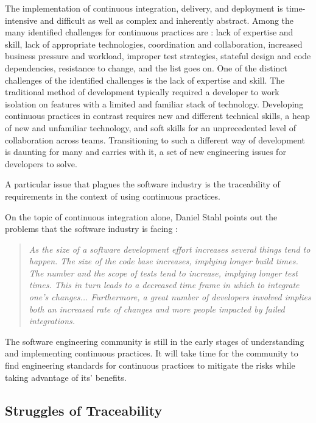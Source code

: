 \documentclass[12pt,a4paper]{article}
\begin{document}
The implementation of continuous integration, delivery, and deployment is time-intensive and difficult as well as complex and inherently abstract. Among the many identified challenges for continuous practices are \cite[p. ~3925-3927]{shahin_babar_zhu_2017}: lack of expertise and skill, lack of appropriate technologies, coordination and collaboration, increased business pressure and workload, improper test strategies, stateful design and code dependencies, resistance to change, and the list goes on. One of the distinct challenges of the identified challenges is the lack of expertise and skill. The traditional method of development typically required a developer to work isolation on features with a limited and familiar stack of technology. Developing continuous practices in contrast requires new and different technical skills, a heap of new and unfamiliar technology, and soft skills for an unprecedented level of collaboration across teams. Transitioning to such a different way of development is daunting for many and carries with it, a set of new engineering issues for developers to solve.

A particular issue that plagues the software industry is the traceability of requirements in the context of using continuous practices. 

On the topic of continuous integration alone, Daniel Stahl points out the problems that the software industry is facing \cite[p. ~60]{stahl_2017}:

\begin{quotation}
    \textit{As the size of a software development effort increases several things tend to happen. The size of the code base increases, implying longer build times. The number and the scope of tests tend to increase, implying longer test times. This in turn leads to a decreased time frame in which to integrate one's changes... Furthermore, a great number of developers involved implies both an increased rate of changes and more people impacted by failed integrations.}
\end{quotation}

The software engineering community is still in the early stages of understanding and implementing continuous practices. It will take time for the community to find engineering standards for continuous practices to mitigate the risks while taking advantage of its' benefits.
        
    \subsection{Struggles of Traceability}
\end{document}
